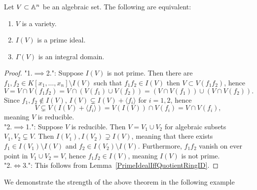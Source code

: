 \begin{proposition}\label{VarietyIffCoordinateRingIsID}
    Let $V\subset \mathbb{A}^n$ be an algebraic set. The following are equivalent:
    \begin{enumerate}
        \item $V$ is a variety.
        \item $I(V)$ is a prime ideal. 
        \item $\Gamma(V)$ is an integral domain. 
    \end{enumerate}
\end{proposition}
\begin{proof}
    "1.$\implies$2.": Suppose $I(V)$ is not prime. Then there are $f_1,f_2\in K[x_1,\dots,x_n]\setminus I(V)$ such that $f_1f_2\in I(V)$ then $V\subset V(f_1f_2)$, hence 
    $$V = V\cap V(f_1f_2) = V\cap \left(V\left(f_1\right)\cup V\left(f_2\right)\right) = \left(V\cap V\left(f_1\right)\right)\cup \left(V\cap V\left(f_2\right)\right).$$
    Since $f_1,f_2\notin I(V)$, $I(V)\subsetneq I(V)+\langle f_i\rangle$ for $i=1,2$, hence 
    $$V \subsetneq V(I(V)+\langle f_i\rangle) = V(I(V)) \cap V(f_i) = V \cap V(f_i),$$
    meaning $V$ is reducible.\\
    "2.$\implies$1.": Suppose $V$ is reducible. Then $V = V_1\cup V_2$ for algebraic subsets $V_1,V_2\subsetneq V$. Then $I(V_1),I(V_2)\supsetneq I(V)$, meaning that there exists $f_1\in I(V_1)\setminus I(V)$ and $f_2\in I(V_2)\setminus I(V)$. Furthermore, $f_1f_2$ vanish on ever point in $V_1\cup V_2 =V$, hence $f_1f_2\in I(V)$, meaning $I(V)$ is not prime.\\
    "2.$\iff$3.": This follows from Lemma~\ref{PrimeIdealIffQuotientRingID}. 
\end{proof}
We demonstrate the strength of the above theorem in the following example
